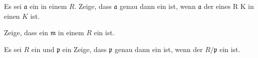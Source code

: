 {} {}




{}


{


Es sei ${\mathfrak a}$ ein
in einem
$R$. Zeige, dass ${\mathfrak a}$ genau dann ein
ist, wenn ${\mathfrak a}$ der
eines
\maabb {\varphi} { R } { K
} {}
in einen
$K$ ist.


}


{} {}




{}


{


Zeige, dass ein
${\mathfrak m}$ in einem
$R$ ein
ist.


}


{} {}




{}


{


Es sei $R$ ein
und ${\mathfrak p}$ ein
Zeige, dass ${\mathfrak p}$ genau dann ein
ist, wenn der
$R/{\mathfrak p}$ ein
ist.


}


{} {}




{}


